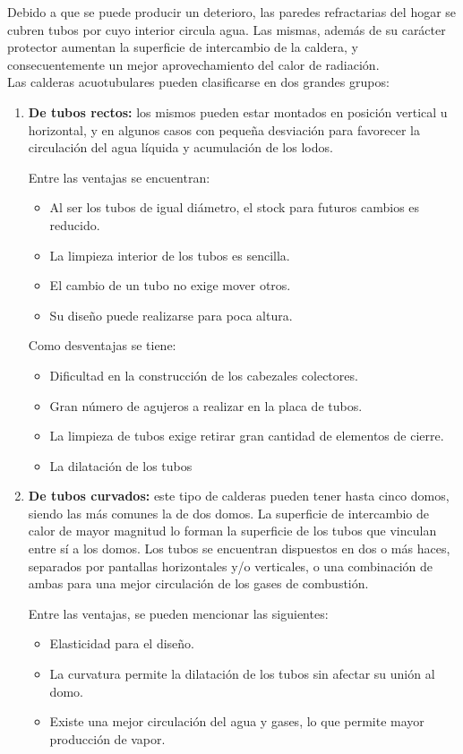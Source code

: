 Debido a que se puede producir un deterioro, las paredes refractarias del hogar se cubren tubos por cuyo interior circula agua. Las mismas, además de su carácter protector aumentan la superficie de intercambio de la caldera, y consecuentemente un mejor aprovechamiento del calor de radiación.\\


Las calderas acuotubulares pueden clasificarse en dos grandes grupos:
\begin{enumerate}[label=\alph*)]
	\item \textbf{De tubos rectos:} los mismos pueden estar montados en posición vertical u horizontal, y en algunos casos con pequeña desviación para favorecer
la circulación del agua líquida y acumulación de los lodos.


	Entre las ventajas se encuentran:
	\begin{itemize}
		\item Al ser los tubos de igual diámetro, el stock para futuros cambios es reducido.
		\item La limpieza interior de los tubos es sencilla.
		\item El cambio de un tubo no exige mover otros.
		\item Su diseño puede realizarse para poca altura.
	\end{itemize}
	Como desventajas se tiene:
	\begin{itemize}
		\item Dificultad en la construcción de los cabezales colectores.
		\item Gran número de agujeros a realizar en la placa de tubos.
		\item La limpieza de tubos exige retirar gran cantidad de elementos de cierre.
		\item La dilatación de los tubos
	\end{itemize}
	\item \textbf{De tubos curvados:} este tipo de calderas pueden tener hasta cinco domos, siendo las más comunes la de dos domos. La superficie de intercambio de calor de mayor magnitud lo forman la superficie de los tubos que vinculan entre sí a los domos. Los tubos se encuentran dispuestos en dos o más haces, separados por pantallas horizontales y/o verticales, o una combinación de ambas para una mejor circulación de los gases de combustión.
	
	Entre las ventajas, se pueden mencionar las siguientes:
	\begin{itemize}
		\item Elasticidad para el diseño.
		\item La curvatura permite la dilatación de los tubos sin afectar su unión al domo.
		\item Existe una mejor circulación del agua y gases, lo que permite mayor producción de vapor.
	\end{itemize}


\end{enumerate}
